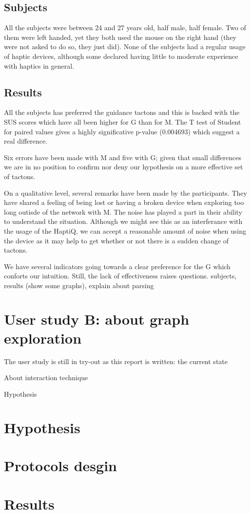 \subsection{Subjects}\label{subjects}

All the subjects were between 24 and 27 years old, half male, half
female. Two of them were left handed, yet they both used the mouse on
the right hand (they were not asked to do so, they just did). None of
the subjects had a regular usage of haptic devices, although some
declared having little to moderate experience with haptics in general.

\subsection{Results}\label{results}

All the subjects has preferred the guidance tactons and this is backed
with the SUS scores which have all been higher for G than for M. The T
test of Student for paired values gives a highly significative p-value
(0.004693) which suggest a real difference.

Six errors have been made with M and five with G; given that small
differences we are in no position to confirm nor deny our hypothesis on
a more effective set of tactons.

On a qualitative level, several remarks have been made by the
participants. They have shared a feeling of being lost or having a
broken device when exploring too long outisde of the network with M. The
noise has played a part in their ability to understand the situation.
Although we might see this as an interferance with the usage of the
HaptiQ, we can accept a reasonable amount of noise when using the device
as it may help to get whether or not there is a sudden change of
tactons.

We have several indicators going towards a clear preference for the G
which conforts our intuition. Still, the lack of effectiveness raises
questions. subjects, results (show some graphs), explain about parsing

\section{User study B: about graph
exploration}\label{user-study-b-about-graph-exploration}




The user study is still in try-out as this report is written: the
current state

About interaction technique

Hypothesis

\section{Hypothesis}\label{hypothesis-1}

\section{Protocols desgin}\label{protocols-desgin}

\section{Results}\label{results-1}

